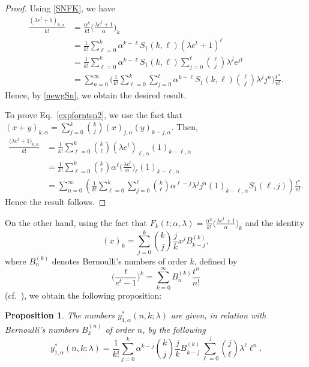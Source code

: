 \documentclass{amsart}
\newtheorem{proposition}[theorem]{Proposition}
\numberwithin{equation}{section}
\theoremstyle{definition}
\theoremstyle{remark}
\begin{document}
\begin{proof}
Using \eqref{SNFK}, we have 
\begin{align*}
\frac{(\lambda e^t+1)_{k,\alpha}}{k!}&=\frac{\alpha^{k}}{k!}\Big(\frac{\lambda e^t+1}{\alpha}\Big)_{k}\\
&=\frac{1}{k!}\sum_{\ell=0}^{k}\alpha^{k-\ell}S_{1}(k,\ell)(\lambda e^t+1)^{\ell}\\
&=\frac{1}{k!}\sum_{\ell=0}^{k}\alpha^{k-\ell}S_{1}(k,\ell)\sum_{j=0}^{\ell}\binom{\ell}{j}\lambda^{j}e^{jt}\\
&=\sum_{n=0}^{\infty}\Bigg(\frac{1}{k!}\sum_{\ell=0}^{k}\sum_{j=0}^{\ell}\alpha^{k-\ell}S_{1}(k,\ell)\binom{\ell}{j}\lambda^{j}j^n\Bigg)\frac{t^n}{n!}.
\end{align*}
Hence, by \eqref{newgSn}, we obtain the desired result.

To prove Eq.~\eqref{expforntsn2}, we use the fact that $(x+y)_{k, \alpha}=\sum\limits_{j=0}^{k}\binom{k}{j}(x)_{j,\alpha}(y)_{k-j, \alpha}$. Then,
\begin{align*}
\frac{\big(\lambda e^t+1\big)_{k, \alpha}}{k!}&=\frac{1}{k!}\sum_{\ell=0}^{k}\binom{k}{\ell}(\lambda e^t)_{\ell, \alpha}(1)_{k-\ell, \alpha}\\
&=\frac{1}{k!}\sum_{\ell=0}^{k}\binom{k}{\ell}\alpha^{\ell}\Big(\frac{\lambda e^t}{\alpha}\Big)_{\ell}(1)_{k-\ell, \alpha}\\
&=\sum_{n=0}^{\infty}\left(\frac{1}{k!}\sum_{\ell=0}^{k}\sum_{j=0}^{\ell}\binom{k}{\ell}\alpha^{\ell-j}\lambda^{j}j^{n}(1)_{k-\ell, \alpha}S_{1}(\ell,j)\right)\frac{t^n}{n!}.
\end{align*}
Hence the result follows.
\end{proof}
On the other hand, using the fact that $F_{k}(t;\alpha,\lambda)=\frac{\alpha^k}{k!}\Big(\frac{\lambda e^t+1}{\alpha}\Big)_{k}$ and the  identity 
\begin{equation}
(x)_{k}=\sum_{j=0}^{k}\binom{k}{j}\frac{j}{k}x^j B_{k-j}^{(k)},
\end{equation}
where $B_{n}^{(k)}$ denotes Bernoulli's numbers of order $k$, defined by 
\begin{equation}
\Big(\frac{t}{e^t-1}\Big)^k=\sum_{k=0}^{\infty}B_{n}^{(k)}\frac{t^n}{n!}
\end{equation} 
(cf.~\cite{LLM1980}), we obtain the following proposition:
\begin{proposition}
The numbers $y_{1,\alpha}^{*}(n,k;\lambda)$ are given, in relation with Bernoulli's numbers $B_{k}^{(n)}$ of order $n$, by the following 
\begin{equation}\label{expforntsn3}
y_{1,\alpha}^{*}(n,k;\lambda)=\frac{1}{k!}\sum_{j=0}^{k}\alpha^{k-j}\binom{k}{j}\frac{j}{k}B_{k-j}^{(k)}\sum_{\ell=0}^{j}\binom{j}{\ell}\lambda^{\ell}\ell^{n}.
\end{equation}
\end{proposition}
\end{document}
